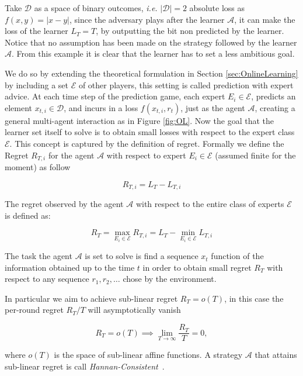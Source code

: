 Take $\mathcal D$ as a space of binary outcomes, \emph{i.e.} $|\mathcal D|=2$ absolute loss as $f(x,y)=|x - y|$, since the adversary plays after the learner $\mathcal A$, it can  make the loss of the learner $L_T=T$, by outputting the bit non predicted by the learner. Notice that no assumption has been made on the strategy followed by the learner $\mathcal A$.
From this example it is clear that the learner has to set a less ambitious goal.

We do so by extending the theoretical formulation in Section \ref{sec:OnlineLearning} by including a set $\mathcal E$ of other players, this setting is called prediction with expert advice. At each time step of the prediction game, each expert $E_i\in\mathcal E$, predicts an element $x_{t,i}\in\mathcal D$, and incurs in a loss $f(x_{t,i},r_t)$, just as the agent $\mathcal A$, creating a general multi-agent interaction as in Figure \ref{fig:OL}.
Now the goal that the learner set itself to solve is to obtain small losses with respect to the expert class $\mathcal E$. This concept is captured by the definition of regret.
Formally we define the Regret $R_{T,i}$ for the agent $\mathcal A$ with respect to expert $E_i\in\mathcal E$ (assumed finite for the moment) as follow

\begin{equation}\label{def:Regret}
	R_{T,i} = L_T-L_{T,i}
\end{equation}

The regret observed by the agent $\mathcal A$ with respect to the entire class of experts $\mathcal E$ is defined as:

\begin{equation}
	R_T=\max\limits_{E_i\in\mathcal E}R_{T,i}=L_T-\min\limits_{E_i\in\mathcal E}L_{T,i}
\end{equation}

The task the agent $\mathcal A$ is set to solve is find a sequence $x_t$ function of the information obtained up to the time $t$ in order to obtain small regret $R_T$ with respect to any sequence $r_1,r_2,\ldots$ chose by the environment.

In particular we aim to achieve sub-linear regret $R_T= o(T)$, in this case the per-round regret $R_T/T$ will asymptotically vanish 

\begin{equation}
	R_T= o(T) \implies \lim\limits_{T\to \infty}\frac{R_T}{T}=0,
\end{equation}

where $ o(T)$ is the space of sub-linear affine functions. A strategy $\mathcal A$ that attains sub-linear regret is call \emph{Hannan-Consistent}~\cite{hannan1957approximation}.

